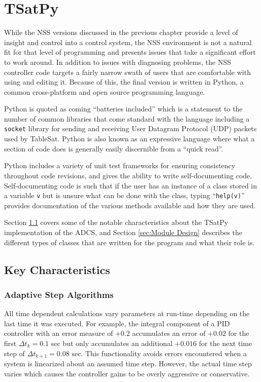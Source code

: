 
\chapter{TSatPy}
\label{chap:TSatPy}

While the NSS versions discussed in the previous chapter provide a level of insight and control into a control system, the NSS environment is not a natural fit for that level of programming and presents issues that take a significant effort to work around.  In addition to issues with diagnosing problems, the NSS controller code targets a fairly narrow swath of users that are comfortable with using and editing it.  Because of this, the final version is written in Python, a common cross-platform and open source programming language.

Python is quoted as coming ``batteries included'' which is a statement to the number of common libraries that come standard with the language including a \verb|socket| library for sending and receiving User Datagram Protocol (UDP) packets used by TableSat.  Python is also known as an expressive language where what a section of code does is generally easily discernible from a ``quick read''.

Python includes a variety of unit test frameworks for ensuring consistency throughout code revisions, and gives the ability to write self-documenting code.  Self-documenting code is such that if the user has an instance of a class stored in a variable \verb|v| but is unsure what can be done with the class, typing ``\verb|help(v)|'' provides documentation of the various methods available and how they are used.

Section \ref{sec:KeyCharacteristics} covers some of the notable characteristics about the TSatPy implementation of the ADCS, and Section \ref{sec:Module Design} describes the different types of classes that are written for the program and what their role is.

\section{Key Characteristics}
\label{sec:KeyCharacteristics}

\subsection{Adaptive Step Algorithms}

All time dependent calculations vary parameters at run-time depending on the last time it was executed. For example, the integral component of a PID controller with an error measure of $+0.2$ accumulates an error of $+0.02$ for the first $\Delta t_k = 0.1$ sec but only accumulates an additional $+0.016$ for the next time step of $\Delta t_{k+1} = 0.08$ sec.  This functionality avoids errors encountered when a system is linearized about an assumed time step.  However, the actual time step varies which causes the controller gains to be overly aggressive or conservative.

